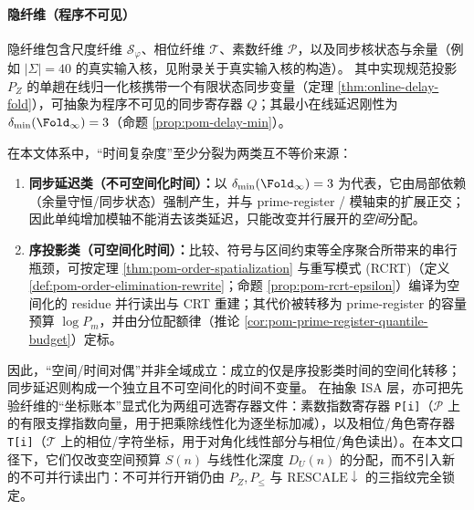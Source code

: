 \paragraph{隐纤维（程序不可见）}
隐纤维包含尺度纤维 $\mathcal{S}_\varphi$、相位纤维 $\mathcal{T}$、素数纤维 $\mathcal{P}$，以及同步核状态与余量（例如 $|\Sigma|=40$ 的真实输入核，见附录关于真实输入核的构造）。
其中实现规范投影 \(P_Z\) 的单趟在线归一化核携带一个有限状态同步变量（定理 \ref{thm:online-delay-fold}），可抽象为程序不可见的同步寄存器 \(Q\)；其最小在线延迟刚性为 \(\delta_{\min}(\Fold_\infty)=3\)（命题 \ref{prop:pom-delay-min}）。
\par
\begin{remark}\label{rem:pom-time-defect-dichotomy}
在本文体系中，“时间复杂度”至少分裂为两类互不等价来源：
\begin{enumerate}
  \item \textbf{同步延迟类（不可空间化时间）：}以 \(\delta_{\min}(\Fold_\infty)=3\) 为代表，它由局部依赖（余量守恒/同步状态）强制产生，并与 prime-register / 模轴束的扩展正交；因此单纯增加模轴不能消去该类延迟，只能改变并行展开的\emph{空间}分配。
  \item \textbf{序投影类（可空间化时间）：}比较、符号与区间约束等全序聚合所带来的串行瓶颈，可按定理 \ref{thm:pom-order-spatialization} 与重写模式 (RCRT)（定义 \ref{def:pom-order-elimination-rewrite}；命题 \ref{prop:pom-rcrt-epsilon}）编译为空间化的 residue 并行读出与 CRT 重建；其代价被转移为 prime-register 的容量预算 \(\log P_m\)，并由分位配额律（推论 \ref{cor:pom-prime-register-quantile-budget}）定标。
\end{enumerate}
因此，“空间/时间对偶”并非全域成立：成立的仅是序投影类时间的空间化转移；同步延迟则构成一个独立且不可空间化的时间不变量。
在抽象 ISA 层，亦可把先验纤维的“坐标账本”显式化为两组可选寄存器文件：素数指数寄存器 \texttt{P[i]}（\(\mathcal{P}\) 上的有限支撑指数向量，用于把乘除线性化为逐坐标加减），以及相位/角色寄存器 \texttt{T[i]}（\(\mathcal{T}\) 上的相位/字符坐标，用于对角化线性部分与相位/角色读出）。在本文口径下，它们仅改变空间预算 \(S(n)\) 与线性化深度 \(D_U(n)\) 的分配，而不引入新的不可并行读出门：不可并行开销仍由 \(P_Z,P_{\le}\) 与 \(\mathrm{RESCALE}\downarrow\) 的三指纹完全锁定。
\end{remark}

